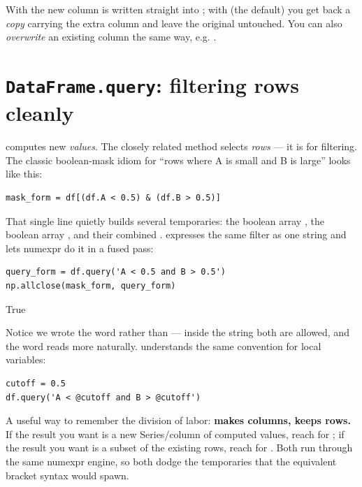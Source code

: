 \documentclass[11pt]{article}
\begin{document}
With  the new column  is written straight into ; with  (the default) you get back a \emph{copy} carrying the extra column and leave the original untouched. You can also \emph{overwrite} an existing column the same way, e.g. .

\section{\texttt{DataFrame.query}: filtering rows cleanly}

 computes new \emph{values}. The closely related  method selects \emph{rows} --- it is for filtering. The classic boolean-mask idiom for ``rows where A is small and B is large'' looks like this:

\begin{lstlisting}
mask_form = df[(df.A < 0.5) & (df.B > 0.5)]
\end{lstlisting}

That single line quietly builds several temporaries: the boolean array , the boolean array , and their combined \code{&}.  expresses the same filter as one string and lets numexpr do it in a fused pass:

\begin{lstlisting}
query_form = df.query('A < 0.5 and B > 0.5')
np.allclose(mask_form, query_form)
\end{lstlisting}

\begin{outblock}
True
\end{outblock}

Notice we wrote the word  rather than \code{&} --- inside the string both are allowed, and the word reads more naturally.  understands the same  convention for local variables:

\begin{lstlisting}
cutoff = 0.5
df.query('A < @cutoff and B > @cutoff')
\end{lstlisting}

\begin{intuition}
A useful way to remember the division of labor: \textbf{ makes columns,  keeps rows.} If the result you want is a new Series/column of computed values, reach for ; if the result you want is a subset of the existing rows, reach for . Both run through the same numexpr engine, so both dodge the temporaries that the equivalent bracket syntax would spawn.
\end{intuition}
\end{document}
